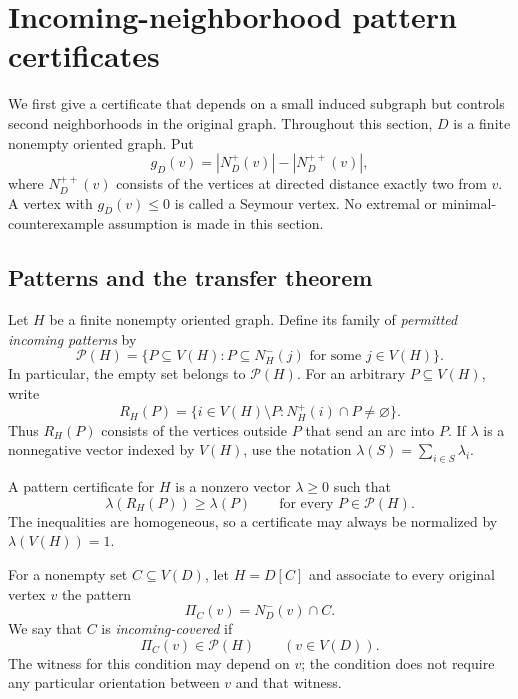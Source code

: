 \section{Incoming-neighborhood pattern certificates}
\label{sec:paper-incoming-certificates}

We first give a certificate that depends on a small induced subgraph but
controls second neighborhoods in the original graph. Throughout this section,
$D$ is a finite nonempty oriented graph. Put
\[
 g_D(v)=|N_D^+(v)|-|N_D^{++}(v)|,
\]
where $N_D^{++}(v)$ consists of the vertices at directed distance exactly
two from $v$. A vertex with $g_D(v)\leq0$ is called a Seymour vertex.
No extremal or minimal-counterexample assumption is made in this section.

\subsection{Patterns and the transfer theorem}

Let $H$ be a finite nonempty oriented graph. Define its family of
\emph{permitted incoming patterns} by
\begin{equation}
 \mathcal P(H)=\{P\subseteq V(H):
           P\subseteq N_H^-(j)\text{ for some }j\in V(H)\}.
 \label{eq:paper-pattern-family}
\end{equation}
In particular, the empty set belongs to $\mathcal P(H)$. For an arbitrary
$P\subseteq V(H)$, write
\[
 R_H(P)=\{i\in V(H)\setminus P:
                      N_H^+(i)\cap P\ne\varnothing\}.
\]
Thus $R_H(P)$ consists of the vertices outside $P$ that send an arc into
$P$. If $\lambda$ is a nonnegative vector indexed by $V(H)$, use the
notation $\lambda(S)=\sum_{i\in S}\lambda_i$.

\begin{definition}
\label{def:paper-pattern-certificate}
A pattern certificate for $H$ is a nonzero vector $\lambda\geq0$ such that
\begin{equation}
 \lambda(R_H(P))\geq\lambda(P)
             \qquad\text{for every }P\in\mathcal P(H).
 \label{eq:paper-pattern-inequalities}
\end{equation}
The inequalities are homogeneous, so a certificate may always be
normalized by $\lambda(V(H))=1$.
\end{definition}

For a nonempty set $C\subseteq V(D)$, let $H=D[C]$ and associate to every
original vertex $v$ the pattern
\[
 \Pi_C(v)=N_D^-(v)\cap C.
\]
We say that $C$ is \emph{incoming-covered} if
\begin{equation}
 \Pi_C(v)\in\mathcal P(H)\qquad(v\in V(D)).
 \label{eq:paper-incoming-covered}
\end{equation}
The witness for this condition may depend on $v$; the condition does not
require any particular orientation between $v$ and that witness.

